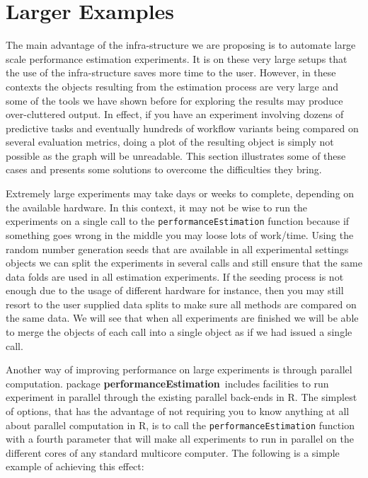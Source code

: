 \documentclass[10pt,a4paper]{article}\usepackage[]{graphicx}\usepackage[]{color}
\newcommand{\PE}{package \textbf{performanceEstimation}\ }
\begin{document}
\section{Larger Examples}

The main advantage of the infra-structure we are proposing is to
automate large scale performance estimation experiments. It is on these very
large setups that the use of the infra-structure saves more time to
the user. However, in these contexts the objects resulting from the
estimation process are very large and some of the tools we have shown before
for exploring the results may produce over-cluttered output. In
effect, if you have an experiment involving dozens of predictive tasks
and eventually hundreds of workflow variants being compared on several
evaluation metrics, doing a plot of the resulting object is simply not
possible as the graph will be unreadable. This section illustrates
some of these cases and presents some solutions to overcome the
difficulties they bring.

Extremely large experiments may take days or weeks to complete,
depending on the available hardware. In this context, it may not be
wise to run the experiments on a single call to the
\texttt{performanceEstimation} function because if something goes
wrong in the middle you may loose lots of work/time. Using the random
number generation seeds that are available in all experimental
settings objects we can split the experiments in several calls and
still ensure that the same data folds are used in all
estimation experiments. If the seeding process is not enough due to the usage of different hardware for instance, then you may still resort to the user supplied data splits to make sure all methods are compared on the same data. We will see that when all experiments are
finished we will be able to merge the objects of each call into a
single object as if we had issued a single call. 

Another way of improving performance on large experiments is through parallel computation. \PE includes facilities to run experiment in parallel through the existing parallel back-ends in R. The simplest of options, that has the advantage of not requiring you to know anything at all about parallel computation in R, is to call the \texttt{performanceEstimation} function with a fourth parameter that will make all experiments to run in parallel on the different cores of any standard multicore computer. The following is a simple example of achieving this effect:
\end{document}
